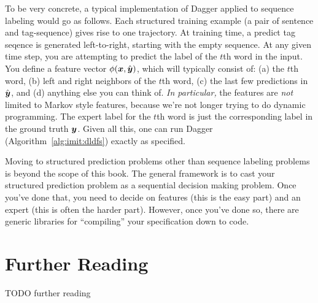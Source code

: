 To be very concrete, a typical implementation of Dagger applied to sequence labeling would go as follows.
Each structured training example (a pair of sentence and tag-sequence) gives rise to one trajectory.
At training time, a predict tag seqence is generated left-to-right, starting with the empty sequence.
At any given time step, you are attempting to predict the label of the $t$th word in the input.
You define a feature vector $\phi({\boldsymbol{x}},\hat{{\boldsymbol{y}}})$, which will typically consist of: (a) the $t$th word, (b) left and right neighbors of the $t$th word, (c) the last few predictions in $\hat{{\boldsymbol{y}}}$, and (d) anything else you can think of.
\emph{In particular,} the features are \emph{not} limited to Markov style features, because we're not longer trying to do dynamic programming.
The expert label for the $t$th word is just the corresponding label in the ground truth ${\boldsymbol{y}}$.
Given all this, one can run Dagger (Algorithm~\ref{alg:imit:dldfs}) exactly as specified.

Moving to structured prediction problems other than sequence labeling problems is beyond the scope of this book. 
The general framework is to cast your structured prediction problem as a sequential decision making problem.
Once you've done that, you need to decide on features (this is the easy part) and an expert (this is often the harder part).
However, once you've done so, there are generic libraries for ``compiling'' your specification down to code.

\section{Further Reading}

TODO further reading



